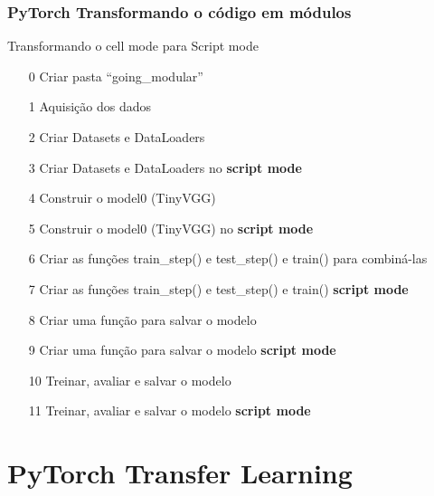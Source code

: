 \documentclass{beamer}
\begin{document}
\begin{frame}
	\frametitle{PyTorch Transformando o código em módulos}
	\begin{block}{Transformando o cell mode para Script mode}
		\begin{itemize}
			\item[0] Criar pasta ``going\_modular''
			\item[1] Aquisição dos dados
			\item[2] Criar Datasets e DataLoaders
			\item[3] Criar Datasets e DataLoaders no \textbf{script mode}
			\item[4] Construir o model0 (TinyVGG)
			\item[5] Construir o model0 (TinyVGG) no \textbf{script mode}
			\item[6] Criar as funções train\_step() e test\_step() e train() para combiná-las
			\item[7] Criar as funções train\_step() e test\_step() e train() \textbf{script mode}
			\item[8] Criar uma função para salvar o modelo
			\item[9] Criar uma função para salvar o modelo \textbf{script mode}
			\item[10] Treinar, avaliar e salvar o modelo
			\item[11] Treinar, avaliar e salvar o modelo \textbf{script mode}
		\end{itemize}
	\end{block}
\end{frame}





\section{PyTorch Transfer Learning}
\end{document}
